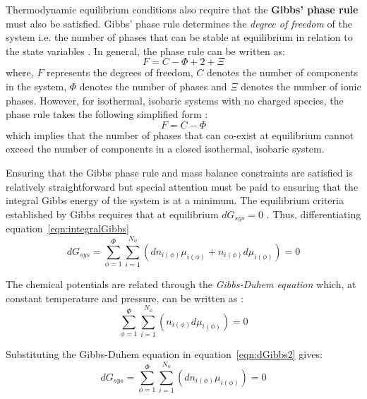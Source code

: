 		Thermodynamic equilibrium conditions also require that the \textbf{Gibbs' phase rule} must also be satisfied. Gibbs' phase rule determines the \emph{degree of freedom} of the system i.e. the number of phases that can be stable at equilibrium in relation to the state variables \cite{Gibbs:1878aa}. In general, the phase rule can be written as:
			\begin{equation}
                			F=C-\Phi + 2 + \Xi
            		\end{equation}
            		where, $F$ represents the degrees of freedom, $C$ denotes the number of components in the system, $\Phi$ denotes the number of phases and $\Xi$ denotes the number of ionic phases. However, for isothermal, isobaric systems with no charged species, the phase rule takes the following simplified form :
			\begin{equation}
                			F=C-\Phi
            		\end{equation}
			which implies that the number of phases that can co-exist at equilibrium cannot exceed the number of components in a closed isothermal, isobaric system.

		Ensuring that the Gibbs phase rule and mass balance constraints are satisfied is relatively straightforward but special attention must be paid to ensuring that the integral Gibbs energy of the system is at a minimum. The equilibrium criteria established by Gibbs requires that at equilibrium $d G_{sys} = 0$ \cite{Gibbs:1878aa}. Thus, differentiating equation~\ref{eqn:integralGibbs}
		\begin{equation}\label{eqn:dGibbs1}
			d G_{sys} = \sum_{\phi=1}^{\Phi} \sum_{i=1}^{N_{\phi}} \left( d n_{i(\phi)}\mu_{i(\phi)} + n_{i(\phi)} d \mu_{i(\phi)}\right) = 0
		\end{equation}

		The chemical potentials are related through the \emph{Gibbs-Duhem equation} which, at constant temperature and pressure, can be written as \cite{Olander08}:
		\begin{equation}\label{eqn:dGibbs2}
			\sum_{\phi=1}^{\Phi} \sum_{i=1}^{N_{\phi}} \left( n_{i(\phi)} d \mu_{i(\phi)}\right) = 0
		\end{equation}

		Substituting the Gibbs-Duhem equation in equation~\ref{eqn:dGibbs2} gives:
		\begin{equation}\label{eqn:dGibbs3}
			d G_{sys} = \sum_{\phi=1}^{\Phi} \sum_{i=1}^{N_{\phi}} \left( d n_{i(\phi)}\mu_{i(\phi)} \right) = 0
		\end{equation}

